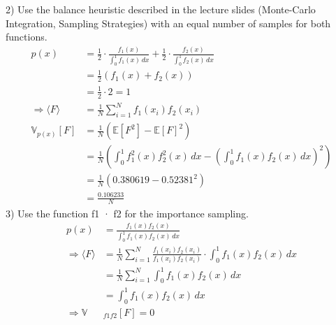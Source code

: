 \documentclass{article}
\begin{document}
    2) Use the balance heuristic described in the lecture slides (Monte-Carlo Integration, Sampling Strategies) with an equal number of samples for both functions. \\
    \begin{align*}
        p(x) &= \frac{1}{2} \cdot \frac{f_1(x)}{\int_{0}^{1} f_1(x)\, dx} + \frac{1}{2} \cdot \frac{f_2(x)}{\int_{0}^{1} f_2(x)\, dx} \\
        &= \frac{1}{2} \left( f_1(x) + f_2(x) \right) \\
        &= \frac{1}{2} \cdot 2
        = 1 \\
        \Rightarrow \langle F \rangle &= \frac{1}{N} \sum_{i=1}^{N} f_1(x_i)f_2(x_i) \\
        \mathbb{V}_{p(x)}[F] &= \frac{1}{N} (\mathbb{E}[F^2] - \mathbb{E}[F]^2) \\
        &= \frac{1}{N} \left( \int_{0}^{1} f_1^2(x)f_2^2(x) \, dx - \left( \int_{0}^{1} f_1(x)f_2(x) \, dx \right)^2 \right) \\
        &= \frac{1}{N} \left( 0.380619 - 0.52381^2 \right) \\
        &= \frac{0.106233}{N}
    \end{align*}
    3) Use the function f1 · f2 for the importance sampling. \\
    \begin{align*}
        p(x) &= \frac{f_1(x)f_2(x)}{\int_{0}^{1} f_1(x)f_2(x)\, dx} \\
        \Rightarrow \langle F \rangle &= \frac{1}{N} \sum_{i=1}^{N} \frac{f_1(x_i)f_2(x_i)}{f_1(x_i)f_2(x_i)} \cdot \int_{0}^{1} f_1(x)f_2(x)\, dx \\
        &= \frac{1}{N} \sum_{i=1}^{N} \int_{0}^{1} f_1(x)f_2(x)\, dx \\
        &= \int_{0}^{1} f_1(x)f_2(x)\, dx \\
        \Rightarrow \mathbb{V}&_{f1f2}[F] = 0
    \end{align*}
\end{document}
